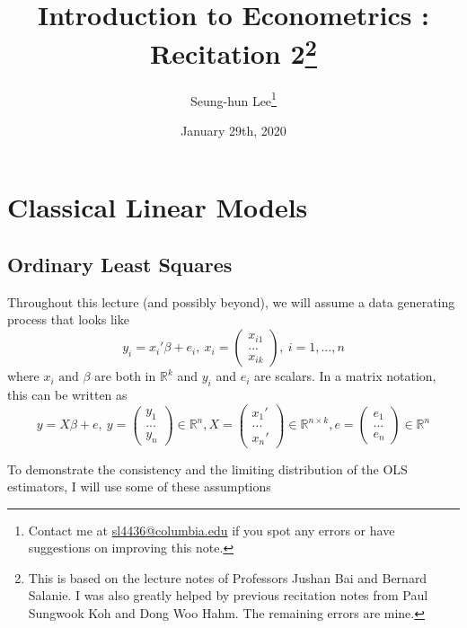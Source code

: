 \documentclass[12pt]{article}
\title{Introduction to Econometrics \ROM{2}: Recitation 2\footnote{This is based on the lecture notes of Professors Jushan Bai and Bernard Salanie. I was also greatly helped by previous recitation notes from Paul Sungwook Koh and Dong Woo Hahm. The remaining errors are mine. }}
\theoremstyle{definition}
\theoremstyle{property}
\theoremstyle{assumption}
\theoremstyle{example}
\theoremstyle{comment}
\begin{document}
\linespread{1.25}
\onehalfspacing

\author{Seung-hun Lee\footnote{Contact me at \href{mailto:sl4436@columbia.edu}{sl4436@columbia.edu} if you spot any errors or have suggestions on improving this note.}}
\date{January 29th, 2020}
\maketitle
\thispagestyle{firstpage}

\section{Classical Linear Models}
\subsection{Ordinary Least Squares}
Throughout this lecture (and possibly beyond), we will assume a data generating process that looks like
\[
y_i = x_i'\beta+e_i, \ x_i = \begin{pmatrix} x_{i1} \\ ... \\ x_{ik}\end{pmatrix}, \ i=1,...,n
\]
where $x_i\text{ and }\beta $ are both in $\mathbb{R}^k$ and $y_i$ and $e_i$ are scalars. In a matrix notation, this can be written as
\[
y=X\beta+e, \ y = \begin{pmatrix} y_{1} \\ ... \\ y_{n}\end{pmatrix}\in\mathbb{R}^n, X = \begin{pmatrix} x_{1}' \\ ... \\ x_{n}'\end{pmatrix} \in\mathbb{R}^{n\times k}, e = \begin{pmatrix} e_{1} \\ ... \\ e_{n}\end{pmatrix}\in\mathbb{R}^n
\]\par
To demonstrate the consistency and the limiting distribution of the OLS estimators, I will use some of these assumptions
\end{document}
